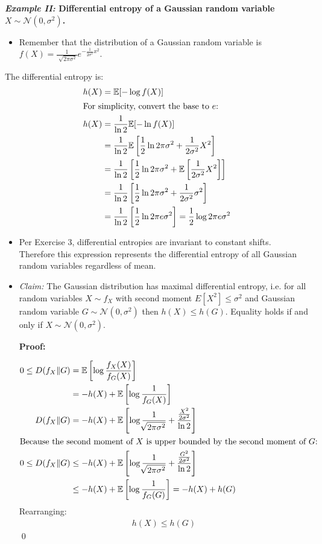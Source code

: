 \documentclass[13pt]{article}
\newcommand{\EE}{\mathbb{E}}
\newcommand{\eq}[1]{\begin{align*}#1\end{align*}}
\begin{document}
\noindent \textbf{\textit{Example II:} Differential entropy of a Gaussian random variable $X \sim \mathcal{N}(0, \sigma^2)$.}
\begin{itemize}
\item Remember that the distribution of a Gaussian random variable is $f(X) = \frac{1}{\sqrt[]{2 \pi \sigma^2}}e^{- \frac{1}{2 \sigma^2}x^2}$.
\end{itemize}
The differential entropy is:
\eq{h(X) &= \EE[- \log f(X)]\\
\intertext{For simplicity, convert the base to $e$:}
h(X) &= \frac{1}{\ln 2} \EE[- \ln f(X)]\\
&= \frac{1}{\ln 2} \EE\left[ \frac{1}{2}\ln 2 \pi \sigma^2 + \frac{1}{2 \sigma^2} X^2 \right] \\
&= \frac{1}{\ln 2} \left[ \frac{1}{2}\ln 2 \pi \sigma^2 + \EE\left[\frac{1}{2 \sigma^2} X^2 \right]\right] \\
&= \frac{1}{\ln 2} \left[ \frac{1}{2}\ln 2 \pi \sigma^2 + \frac{1}{2 \sigma^2} \sigma^2 \right] \\
&= \frac{1}{\ln 2} \left[ \frac{1}{2} \ln 2 \pi e \sigma^2 \right] = \frac{1}{2} \log 2\pi e \sigma^2
}
\begin{itemize}
\item Per Exercise 3, differential entropies are invariant to constant shifts. Therefore this expression represents the differential entropy of all Gaussian random variables regardless of mean.
\item \textit{Claim:} The Gaussian distribution has maximal differential entropy, i.e. for all random variables $X \sim f_X$ with second moment $E[X^2] \leq \sigma^2$ and Gaussian random variable $G \sim \mathcal{N}(0, \sigma^2)$ then $h(X) \leq h(G)$. Equality holds if and only if $X \sim \mathcal{N}(0, \sigma^2)$.

\textbf{Proof:}

\eq{0 \leq D(f_X \Vert G ) &= \EE \left[ \log \frac{f_X(X)}{f_G(X)} \right] \\
&= - h(X) + \EE \left[ \log \frac{1}{f_G(X)} \right]\\
D(f_X \Vert G ) &= - h(X) + \EE \left[ \log \frac{1}{\sqrt[]{2 \pi \sigma^2}} + \frac{\frac{X^2}{2 \sigma^2}}{\ln 2} \right]\\
\intertext{Because the second moment of $X$ is upper bounded by the second moment of $G$:}
0 \leq D(f_X \Vert G ) &\leq - h(X) + \EE \left[ \log \frac{1}{\sqrt[]{2 \pi \sigma^2}} + \frac{\frac{G^2}{2 \sigma^2}}{\ln 2} \right]\\
&\leq - h(X) + \EE \left[ \log \frac{1}{f_G (G)}\right] = -h(X) + h(G)
}
Rearranging:
\eq{h(X) \leq h(G)}
\qed
\end{itemize}
\end{document}
